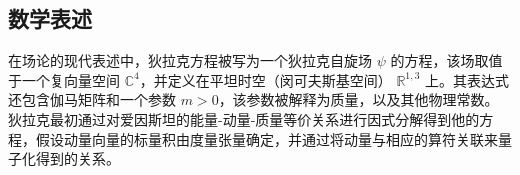 \subsection{数学表述}
在场论的现代表述中，狄拉克方程被写为一个狄拉克自旋场 \( \psi \) 的方程，该场取值于一个复向量空间 \( \mathbb{C}^4 \)，并定义在平坦时空（闵可夫斯基空间） \( \mathbb{R}^{1,3} \) 上。其表达式还包含伽马矩阵和一个参数 \( m > 0 \)，该参数被解释为质量，以及其他物理常数。狄拉克最初通过对爱因斯坦的能量-动量-质量等价关系进行因式分解得到他的方程，假设动量向量的标量积由度量张量确定，并通过将动量与相应的算符关联来量子化得到的关系。






























































































